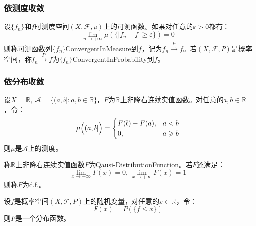 \subsubsection{依测度收敛}
\begin{definition}
	设$\{f_n\}$和$f$时测度空间$(X,\mathscr{F},\mu)$上的可测函数。如果对任意的$\varepsilon>0$都有：
	\begin{equation*}
		\lim_{n\to+\infty}\mu(\{|f_n-f|\geqslant\varepsilon\})=0
	\end{equation*}
	则称可测函数列$\{f_n\}$\gls{ConvergentInMeasure}到$f$，记为$f_n\overset{\mu}{\longrightarrow}f$。若$(X,\mathscr{F},P)$是概率空间，称$f_n\overset{P}{\longrightarrow}f$为$\{f_n\}$\gls{ConvergentInProbability}到$f$。
\end{definition}
\subsubsection{依分布收敛}
\begin{theorem}
	设$X=\mathbb{R},\;\mathscr{A}=\{(a,b]:a,b\in\mathbb{R}\}$，$F$为$\mathbb{R}^{}$上非降右连续实值函数。对任意的$a,b\in\mathbb{R}$，令：
	\begin{equation*}
		\mu\Bigl((a,b]\Bigr)=
		\begin{cases}
			F(b)-F(a),&a<b \\
			0,&a\geqslant b
		\end{cases}
	\end{equation*}
	则$\mu$是$\mathscr{A}$上的测度。
\end{theorem}
\begin{definition}
	称$\mathbb{R}^{}$上非降右连续实值函数$F$为\gls{Qausi-DistributionFunction}。若$F$还满足：
	\begin{equation*}
		\lim_{x\to-\infty}F(x)=0,\;\lim_{x\to+\infty}F(x)=1
	\end{equation*}
	则称$F$为\gls{d.f.}。
\end{definition}
\begin{theorem}
	设$f$是概率空间$(X,\mathscr{F},P)$上的随机变量，对任意的$x\in\mathbb{R}^{}$，令：
	\begin{equation*}
		F(x)=P(\{f\leqslant x\})
	\end{equation*}
	则$F$是一个分布函数。
\end{theorem}
